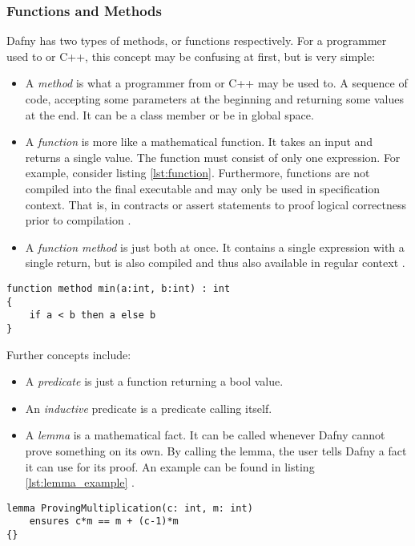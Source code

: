 \subsubsection{Functions and Methods}
Dafny has two types of methods, or functions respectively.
For a programmer used to \CsharpWithSpace or C++, this concept may be confusing at first, but is very simple:
\begin{itemize}
\item A \textit{method} is what a programmer from \CsharpWithSpace or C++ may be used to.
A sequence of code, accepting some parameters at the beginning and returning some values at the end.
It can be a class member or be in global space.
\item A \textit{function} is more like a mathematical function.
It takes an input and returns a single value.
The function must consist of only one expression.
For example, consider listing \ref{lst:function}.
Furthermore, functions are not compiled into the final executable and may only be used in specification context.
That is, in contracts or assert statements to proof logical correctness prior to compilation \cite{functionVSMethod}.
\item A \textit{function method} is just both at once.
It contains a single expression with a single return, but is also compiled and thus also available in regular context \cite{functionVSMethod}.
\end{itemize}

\begin{lstlisting}[language=dafny, caption={Function Method Example}, captionpos=b, label={lst:function}]
function method min(a:int, b:int) : int
{
    if a < b then a else b
}
\end{lstlisting}

Further concepts include:
\begin{itemize}
\item A \textit{predicate} is just a function returning a bool value.
\item An \textit{inductive} predicate is a predicate calling itself.
\item A \textit{lemma} is a mathematical fact.
It can be called whenever Dafny cannot prove something on its own.
By calling the lemma, the user tells Dafny a fact it can use for its proof.
An example can be found in listing \ref{lst:lemma_example} \cite{dafnyReferenceManual}.
\end{itemize}

\begin{lstlisting}[language=dafny, caption={Lemma}, captionpos=b, label={lst:lemma_example}]
lemma ProvingMultiplication(c: int, m: int)
    ensures c*m == m + (c-1)*m
{}
\end{lstlisting}

